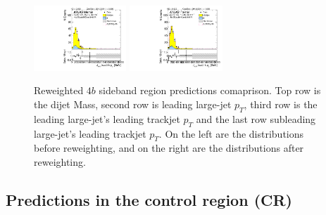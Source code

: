 \begin{figure}[htbp!]
\begin{center}
\includegraphics[width=0.31\textwidth,angle=-90]{figures/boosted/Prereweight/Moriond_FourTag_Sideband_sublHCand_trk0_Pt.pdf}
\includegraphics[width=0.31\textwidth,angle=-90]{figures/boosted/Sideband/b77_FourTag_Sideband_sublHCand_trk0_Pt.pdf}\\
\caption{Reweighted $4b$ sideband region predictions comaprison. Top row is the dijet Mass, second row is leading large-\R jet $p_{T}$, third row is the leading large-\R jet's leading trackjet $p_T$ and the last row subleading large-\R jet's leading trackjet $p_T$. On the left are the distributions before reweighting, and on the right are the distributions after reweighting.}
\label{fig:rw-4b-comp-sb}
\end{center}
\end{figure}

\subsection{Predictions in the control region (CR)}
\label{sec:boosted-cr}


